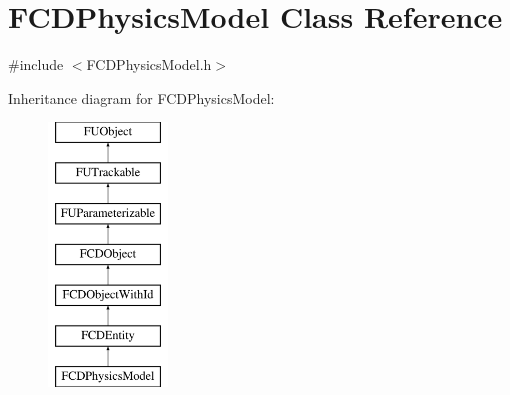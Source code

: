 \hypertarget{classFCDPhysicsModel}{
\section{FCDPhysicsModel Class Reference}
\label{classFCDPhysicsModel}
}


{\ttfamily \#include $<$FCDPhysicsModel.h$>$}

Inheritance diagram for FCDPhysicsModel:\begin{figure}[H]
\begin{center}
\leavevmode
\includegraphics[height=7.000000cm]{classFCDPhysicsModel}
\end{center}
\end{figure}
